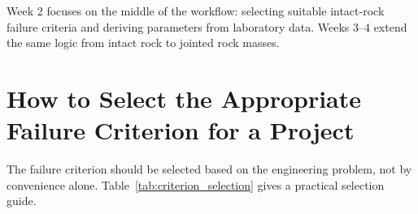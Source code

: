 \documentclass[a4paper,12pt]{article}
\begin{document}
\begin{keybox}
Week 2 focuses on the middle of the workflow: selecting suitable intact-rock failure
criteria and deriving parameters from laboratory data. Weeks 3--4 extend the same logic
from intact rock to jointed rock masses.
\end{keybox}

\section{How to Select the Appropriate Failure Criterion for a Project}

The failure criterion should be selected based on the engineering problem, not by
convenience alone. Table~\ref{tab:criterion_selection} gives a practical selection guide.
\end{document}
